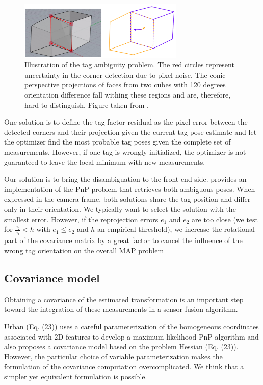 \begin{figure}
    \centering
    \includegraphics[width=0.7\textwidth]{figures/tag_ambiguity.png}
    \caption{Illustration of the tag ambiguity problem. The red circles represent uncertainty in the corner detection due to pixel noise. 
    The conic perspective projections of faces from two cubes with 120 degrees orientation difference fall withing these regions and are, therefore, 
    hard to distinguish. Figure taken from \cite{8206468}.}
    \label{fig:tag_ambiguity}
\end{figure}

One solution is to define the tag factor residual as the pixel error between the detected corners and their projection given the
current tag pose estimate and let the optimizer find the most probable tag poses given the complete set of measurements. However, if one tag is wrongly initialized, 
the optimizer is not guaranteed to leave the local minimum with new measurements. 

Our solution is to bring the disambiguation to the front-end side.
\cite{collins2014infinitesimal} provides an implementation of the PnP problem that retrieves both ambiguous poses. When expressed in the camera frame, 
both solutions share the tag position and differ only in their orientation. We typically want to select the solution with the smallest error. 
However, if the reprojection errors $e_1$ and $e_2$ are too close (we test for $\tfrac{e_2}{e_1} < h$ with $e_1 \leq e_2$ and $h$ an empirical threshold), 
we increase the rotational part of the covariance matrix by a great factor to cancel the influence of the wrong tag orientation on the 
overall MAP problem

\subsection{Covariance model}
Obtaining a covariance of the estimated transformation is an important step toward the integration of these measurements in a sensor fusion algorithm.

Urban \cite{urban2016mlpnp} (Eq. (23)) uses a careful parameterization of the homogeneous coordinates associated with 2D features to develop
a maximum likelihood PnP algorithm and also proposes a covariance model based on the problem Hessian (Eq. (23)).  However, the particular choice of variable 
parameterization makes the formulation of the covariance computation overcomplicated.
We think that a simpler yet equivalent formulation is possible. 

